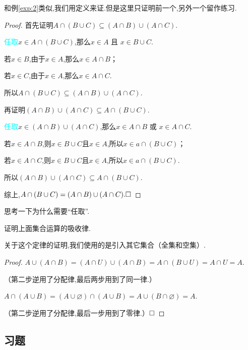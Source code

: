 \documentclass[lang=cn,math=cm,chinesefont=nofont,11pt,scheme=chinese,twocol]{elegantbook}
\begin{document}
  和例\ref{exp:2}类似,我们用定义来证.但是这里只证明前一个,另外一个留作练习.

\begin{proof}
  首先证明$A\cap(B\cup C)\subseteq(A\cap B)\cup(A\cap C)$.

  \textcolor{cyan}{任取}\enspace$x\in A\cap(B\cup C)$,那么$x\in A\text{ 且 }x\in B\cup C$.

  若$x\in B$,由于$x\in A$,那么$x\in A\cap B$；

  若$x\in C$,由于$x\in A$,那么$x\in A\cap C$.

  所以$A\cap(B\cup C)\subseteq(A\cap B)\cup(A\cap C)$.

  \hspace*{\fill}

  再证明$(A\cap B)\cup(A\cap C)\subseteq A\cap(B\cup C)$.

  \textcolor{cyan}{任取}\enspace$x\in (A\cap B)\cup(A\cap C)$,那么$x\in A\cap B\text{ 或 }x\in A\cap C$.

  若$x\in A\cap B$,则$x\in B\cup C\text{且}x\in A$,所以$x\in a\cap(B\cup C)$；

  若$x\in A\cap C$,则$x\in B\cup C\text{且}x\in A$,所以$x\in a\cap(B\cup C)$.

  所以$(A\cap B)\cup(A\cap C)\subseteq A\cap(B\cup C)$.

  综上,$A\cap(B\cup C)=(A\cap B)\cup(A\cap C).\hfill\square$
\end{proof}
\begin{remark}
  思考一下为什么需要“任取”.
\end{remark}

\hspace*{\fill}

\begin{example}
  证明上面集合运算的吸收律.
\end{example}
关于这个定律的证明,我们使用的是引入其它集合（全集和空集）.

\begin{proof}
  $A\cup (A\cap B)=(A\cap U)\cup(A\cap B)=A\cap(B\cup U)=A\cap U=A.$

  （第二步逆用了分配律,最后两步用到了同一律.）

  $A\cap(A\cup B)=(A\cup\varnothing)\cap(A\cup B)=A\cup(B\cap\varnothing)=A.$

  （第二步逆用了分配律,最后一步用到了零律.）$\hfill\square$
\end{proof}

\subsection{习题}
\end{document}
